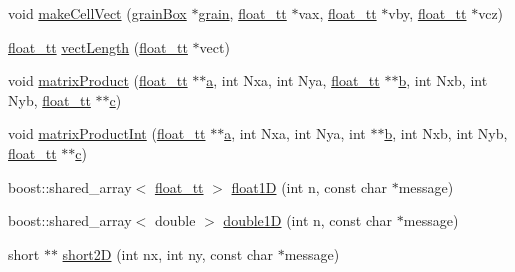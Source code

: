 \begin{DoxyCompactItemize}
\item 
void \hyperlink{namespace_q_s_t_e_m_a27a096719e7ddfebba30a0c3bc7a0966}{make\-Cell\-Vect} (\hyperlink{namespace_q_s_t_e_m_afc13846814505527653b1f6a2377b926}{grain\-Box} $\ast$\hyperlink{qmb_8m_a0c242177b5df8026b76c43e301121a57}{grain}, \hyperlink{namespace_q_s_t_e_m_a915d7caa497280d9f927c4ce8d330e47}{float\-\_\-tt} $\ast$vax, \hyperlink{namespace_q_s_t_e_m_a915d7caa497280d9f927c4ce8d330e47}{float\-\_\-tt} $\ast$vby, \hyperlink{namespace_q_s_t_e_m_a915d7caa497280d9f927c4ce8d330e47}{float\-\_\-tt} $\ast$vcz)
\item 
\hyperlink{namespace_q_s_t_e_m_a915d7caa497280d9f927c4ce8d330e47}{float\-\_\-tt} \hyperlink{namespace_q_s_t_e_m_a4a1a9b85d5c9d701837b0e95e99a805b}{vect\-Length} (\hyperlink{namespace_q_s_t_e_m_a915d7caa497280d9f927c4ce8d330e47}{float\-\_\-tt} $\ast$vect)
\item 
void \hyperlink{namespace_q_s_t_e_m_a3748387153d44d8d383d44bf9df76cf6}{matrix\-Product} (\hyperlink{namespace_q_s_t_e_m_a915d7caa497280d9f927c4ce8d330e47}{float\-\_\-tt} $\ast$$\ast$\hyperlink{image_sim_8m_aa9c57d86c53f86ed6afc6339a0476363}{a}, int Nxa, int Nya, \hyperlink{namespace_q_s_t_e_m_a915d7caa497280d9f927c4ce8d330e47}{float\-\_\-tt} $\ast$$\ast$\hyperlink{xyz2cfg_8m_a21ad0bd836b90d08f4cf640b4c298e7c}{b}, int Nxb, int Nyb, \hyperlink{namespace_q_s_t_e_m_a915d7caa497280d9f927c4ce8d330e47}{float\-\_\-tt} $\ast$$\ast$\hyperlink{image_sim_8m_a463b16ca2bfa2f0cbab0e62fcb263d8e}{c})
\item 
void \hyperlink{namespace_q_s_t_e_m_ab44ad034a5034217de267ab5e0754ad2}{matrix\-Product\-Int} (\hyperlink{namespace_q_s_t_e_m_a915d7caa497280d9f927c4ce8d330e47}{float\-\_\-tt} $\ast$$\ast$\hyperlink{image_sim_8m_aa9c57d86c53f86ed6afc6339a0476363}{a}, int Nxa, int Nya, int $\ast$$\ast$\hyperlink{xyz2cfg_8m_a21ad0bd836b90d08f4cf640b4c298e7c}{b}, int Nxb, int Nyb, \hyperlink{namespace_q_s_t_e_m_a915d7caa497280d9f927c4ce8d330e47}{float\-\_\-tt} $\ast$$\ast$\hyperlink{image_sim_8m_a463b16ca2bfa2f0cbab0e62fcb263d8e}{c})
\item 
boost\-::shared\-\_\-array$<$ \hyperlink{namespace_q_s_t_e_m_a915d7caa497280d9f927c4ce8d330e47}{float\-\_\-tt} $>$ \hyperlink{namespace_q_s_t_e_m_a2afd56d6aa92f762eb233f54f39f880b}{float1\-D} (int n, const char $\ast$message)
\item 
boost\-::shared\-\_\-array$<$ double $>$ \hyperlink{namespace_q_s_t_e_m_a3c6e64bb6444720850b2af4463d02a44}{double1\-D} (int n, const char $\ast$message)
\item 
short $\ast$$\ast$ \hyperlink{namespace_q_s_t_e_m_ac6fbfcb174875805f137c8d52647c4b7}{short2\-D} (int nx, int ny, const char $\ast$message)
$$
\end{DoxyCompactItemize}
